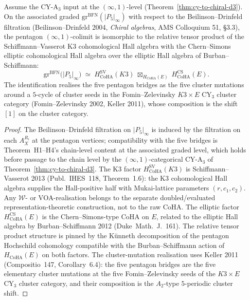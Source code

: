 \begin{proposition}
\label{prop:generator-level-coha-tensor-elliptic}
Assume the CY-A$_3$ input at the $(\infty,1)$-level
(Theorem~\ref{thm:cy-to-chiral-d3}).
On the associated graded $\mathrm{gr}^{\mathrm{BFN}}(|P_5|_\infty)$ with respect to the
Beilinson--Drinfeld filtration (Beilinson--Drinfeld 2004,
\emph{Chiral algebras}, AMS Colloquium 51, \S3.3), the pentagon $(\infty,1)$-colimit is
isomorphic to the relative tensor product of the Schiffmann--Vasserot K3 cohomological Hall
algebra with the Chern--Simons elliptic cohomological Hall algebra over the elliptic Hall
algebra of Burban--Schiffmann:
\[
 \mathrm{gr}^{\mathrm{BFN}}\bigl(|P_5|_\infty\bigr)
 \;\simeq\;
 H^{\mathrm{SV}}_{\mathrm{CoHA}}(K3)
 \;\boxtimes_{H_{\mathrm{CoHA}}(E)}\;
 H^{\mathrm{CS}}_{\mathrm{CoHA}}(E).
\]
The identification realises the five pentagon bridges as the five cluster mutations around a
$5$-cycle of cluster seeds in the Fomin--Zelevinsky $K3 \times E$ CY$_3$ cluster category
(Fomin--Zelevinsky 2002, Keller 2011), whose composition is the shift $[1]$ on the cluster
category.
\end{proposition}

\begin{proof}
The Beilinson--Drinfeld filtration on $|P_5|_\infty$ is induced by the filtration on each
$A_X^{R_i}$ at the pentagon vertices; compatibility with the five bridges is Theorem~H1--H4's
chain-level content at the associated graded level, which holds before passage to the chain
level by the $(\infty,1)$-categorical CY-A$_3$ of Theorem~\ref{thm:cy-to-chiral-d3}. The K3
factor $H^{\mathrm{SV}}_{\mathrm{CoHA}}(K3)$ is Schiffmann--Vasserot 2013 (Publ.~IHES~118,
Theorem~1.6): the K3 cohomological Hall algebra supplies the Hall-positive
half with Mukai-lattice parameters $(r, c_1, c_2)$. Any
$\mathcal{W}$- or VOA-realisation belongs to the separate doubled/evaluated
representation-theoretic construction, not to the raw CoHA. The elliptic factor
$H^{\mathrm{CS}}_{\mathrm{CoHA}}(E)$ is the Chern--Simons-type CoHA on $E$, related to the
elliptic Hall algebra by Burban--Schiffmann 2012 (Duke~Math.~J.~161). The relative tensor
product structure is pinned by the K\"unneth decomposition of the pentagon Hochschild cohomology
compatible with the Burban--Schiffmann action of $H_{\mathrm{CoHA}}(E)$ on both factors. The
cluster-mutation realisation uses Keller 2011 (Compositio~147, Corollary~6.4): the five
pentagon bridges are the five elementary cluster mutations at the five Fomin--Zelevinsky seeds
of the $K3 \times E$ CY$_3$ cluster category, and their composition is the $A_2$-type
$5$-periodic cluster shift.
\end{proof}

